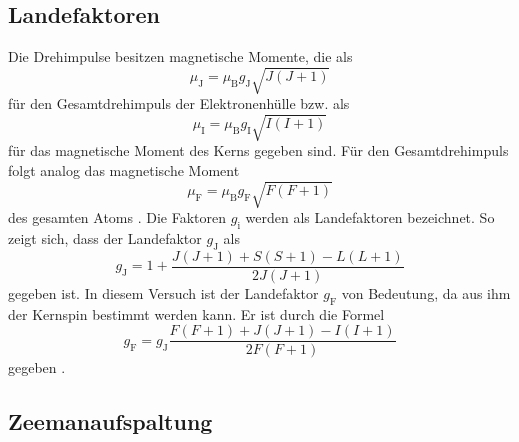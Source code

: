 \subsection{Landefaktoren}

Die Drehimpulse besitzen magnetische Momente, die als 
\begin{equation}
    \mu_{\text{J}} = \mu_{\text{B}} g_{\text{J}} \sqrt{J(J+1)}
\end{equation}
für den Gesamtdrehimpuls der Elektronenhülle bzw. als 
\begin{equation}
    \mu_{\text{I}} = \mu_{\text{B}} g_{\text{I}} \sqrt{I(I+1)}
\end{equation}
für das magnetische Moment des Kerns gegeben sind.
Für den Gesamtdrehimpuls folgt analog das magnetische Moment 
\begin{equation}
    \mu_{\text{F}} = \mu_{\text{B}} g_{\text{F}} \sqrt{F(F+1)}
\end{equation}
des gesamten Atoms \cite{1}.
Die Faktoren $g_{\text{i}}$ werden als Landefaktoren bezeichnet.
So zeigt sich, dass der Landefaktor $g_{\text{J}}$
als 
\begin{equation}
    g_{\text{J}} = 1+ \frac{J(J+1) +S(S+1) -L(L+1)}{2J(J+1)}
\end{equation}
gegeben ist.
In diesem Versuch  ist der Landefaktor $g_{\text{F}}$ von Bedeutung, da
aus ihm der Kernspin bestimmt werden kann. 
Er ist durch die Formel
\begin{equation}
    g_{\text{F}} = g_{\text{J}} \frac{F(F+1) + J(J+1) - I(I+1)}{2F(F+1)} 
\end{equation}
gegeben \cite{2}. 

\subsection{Zeemanaufspaltung} 

